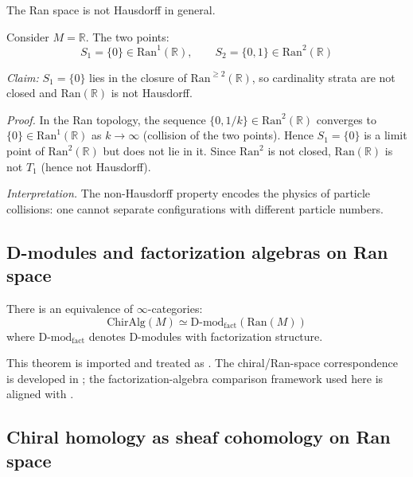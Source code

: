 \begin{example}
\label{ex:ran-non-hausdorff}
The Ran space is not Hausdorff in general.

Consider $M = \mathbb{R}$. The two points:
\[S_1 = \{0\} \in \mathrm{Ran}^1(\mathbb{R}), \qquad S_2 = \{0, 1\} \in \mathrm{Ran}^2(\mathbb{R})\]

\emph{Claim:} $S_1 = \{0\}$ lies in the closure of $\mathrm{Ran}^{\geq 2}(\mathbb{R})$, so cardinality strata are not closed and $\mathrm{Ran}(\mathbb{R})$ is not Hausdorff.

\emph{Proof.} In the Ran topology, the sequence $\{0, 1/k\} \in \mathrm{Ran}^2(\mathbb{R})$ converges to $\{0\} \in \mathrm{Ran}^1(\mathbb{R})$ as $k \to \infty$ (collision of the two points). Hence $S_1 = \{0\}$ is a limit point of $\mathrm{Ran}^2(\mathbb{R})$ but does not lie in it. Since $\mathrm{Ran}^2$ is not closed, $\mathrm{Ran}(\mathbb{R})$ is not $T_1$ (hence not Hausdorff).

\emph{Interpretation.} The non-Hausdorff property encodes the physics of particle collisions: one cannot separate configurations with different particle numbers.
\end{example}

\subsection{D-modules and factorization algebras on Ran space}

\begin{theorem}
\label{thm:chiral-ran-Dmod}
There is an equivalence of $\infty$-categories:
\[\text{ChirAlg}(M) \simeq \text{D-mod}_{\text{fact}}(\text{Ran}(M))\]
where $\text{D-mod}_{\text{fact}}$ denotes D-modules with factorization structure.
\end{theorem}

\begin{remark}
This theorem is imported and treated as \ClaimStatusProvedElsewhere. The
chiral/Ran-space correspondence is developed in \cite[Chapter~3]{BD04}; the
factorization-algebra comparison framework used here is aligned with
\cite{FG12,CG17}.
\end{remark}

\subsection{Chiral homology as sheaf cohomology on Ran space}

